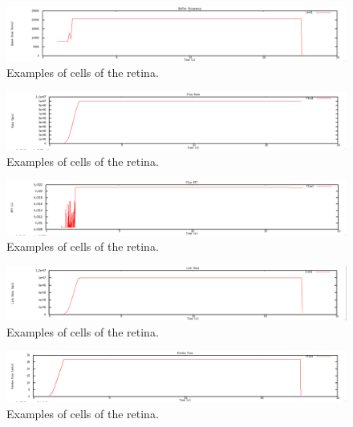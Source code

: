 \documentclass[12pt]{article}
\begin{document}
\newpage


\begin{figure}[!ht]
\centering \includegraphics[bb= 0 0 1300 250, scale=.35]{figures/Test0_Vegas/buffer_occ.png}
\caption{Examples of cells of the retina.}
\label{fig:test0_vegas_buffer_occ}
\end{figure}

\begin{figure}[!ht]
\centering \includegraphics[bb= 0 0 1300 250, scale=.35]{figures/Test0_Vegas/flow_rate.png}
\caption{Examples of cells of the retina.}
\label{fig:test0_vegas_flow_rate}
\end{figure}

\begin{figure}[!ht]
\centering \includegraphics[bb= 0 0 1300 250, scale=.35]{figures/Test0_Vegas/flow_rtt.png}
\caption{Examples of cells of the retina.}
\label{fig:test0_vegas_flow_rtt}
\end{figure}

\begin{figure}[!ht]
\centering \includegraphics[bb= 0 0 1300 250, scale=.35]{figures/Test0_Vegas/link_rate.png}
\caption{Examples of cells of the retina.}
\label{fig:test0_vegas_link_rate}
\end{figure}

\begin{figure}[!ht]
\centering \includegraphics[bb= 0 0 1300 250, scale=.35]{figures/Test0_Vegas/window_size.png}
\caption{Examples of cells of the retina.}
\label{fig:test0_vegas_window_size}
\end{figure}
\end{document}

